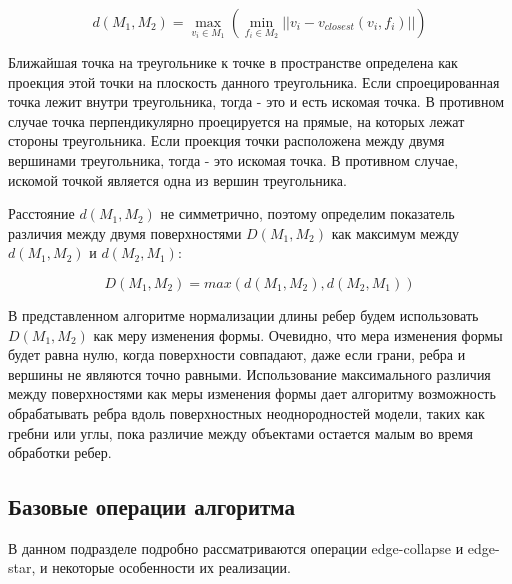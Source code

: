 \documentclass[14pt]{article}
\numberwithin{figure}{section}
\numberwithin{equation}{section}
\begin{document}
\begin{equation}
	d(M_1, M_2) = \max_{v_i \in M_1}(\min_{f_i \in M_2}||v_i - v_{closest}(v_i, f_i)||)
\end{equation}


Ближайшая точка на треугольнике к точке в пространстве определена как проекция этой точки на плоскость данного треугольника. Если спроецированная точка лежит внутри треугольника, тогда - это и есть искомая точка. В противном случае точка перпендикулярно проецируется на прямые, на которых лежат стороны треугольника. Если проекция точки расположена между двумя вершинами треугольника, тогда - это искомая точка. В противном случае, искомой точкой является одна из вершин треугольника.


Расстояние $d(M_1, M_2)$ не симметрично, поэтому определим показатель различия между двумя поверхностями $D(M_1, M_2)$ как максимум между $d(M_1, M_2)$ и $d(M_2, M_1)$:

\begin{equation}
	D(M_1, M_2) = max(d(M_1, M_2), d(M_2, M_1))
\end{equation}

В представленном алгоритме нормализации длины ребер будем использовать $D(M_1, M_2)$ как меру изменения формы. Очевидно, что мера изменения формы будет равна нулю, когда поверхности совпадают, даже если грани, ребра и вершины не являются точно равными. Использование максимального различия между поверхностями как меры изменения формы дает алгоритму возможность обрабатывать ребра вдоль поверхностных неоднородностей модели, таких как гребни или углы, пока различие между объектами остается малым во время обработки ребер.


\subsection{Базовые операции алгоритма}

В данном подразделе подробно рассматриваются операции edge-collapse и edge-star, и некоторые особенности их реализации.
\end{document}

